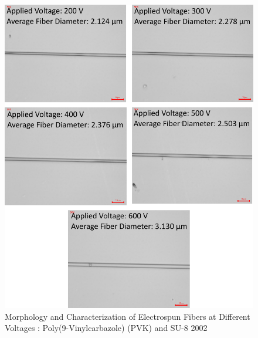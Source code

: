 \begin{figure}[!th]
\centering
\includegraphics[scale=0.55]{./Figures/microscopy_pvk_su8.png}
\decoRule
\caption[Morphology and Characterization of Electrospun Fibers at Different Voltages : Poly(9-Vinylcarbazole) (PVK) and SU-8 2002 ]{Morphology and Characterization of Electrospun Fibers at Different Voltages : Poly(9-Vinylcarbazole) (PVK) and SU-8 2002 }
\label{fig:microscopy_pvk_su8}
\end{figure}

